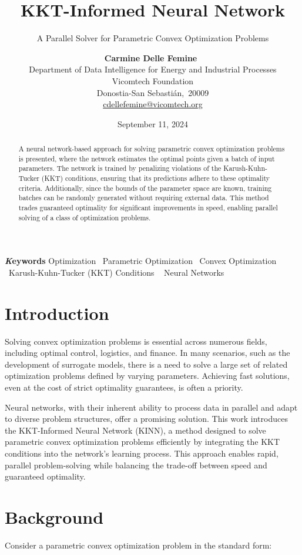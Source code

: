 \documentclass[
]{article}
\title{KKT-Informed Neural Network}
\subtitle{A Parallel Solver for Parametric Convex Optimization Problems}
\author{\textbf{Carmine Delle
Femine}~\orcidlink{0009-0005-7964-8911}\\Department of Data Intelligence
for Energy and Industrial Processes\\Vicomtech Foundation\\Donostia-San
Sebastián,\ 20009\\\href{mailto:cdellefemine@vicomtech.org}{cdellefemine@vicomtech.org}}
\date{September 11, 2024}
\begin{document}
\maketitle
\begin{abstract}
A neural network-based approach for solving parametric convex
optimization problems is presented, where the network estimates the
optimal points given a batch of input parameters. The network is trained
by penalizing violations of the Karush-Kuhn-Tucker (KKT) conditions,
ensuring that its predictions adhere to these optimality criteria.
Additionally, since the bounds of the parameter space are known,
training batches can be randomly generated without requiring external
data. This method trades guaranteed optimality for significant
improvements in speed, enabling parallel solving of a class of
optimization problems.
\end{abstract}
{\bfseries \emph Keywords}
\def\sep{\textbullet\ }
Optimization \sep Parametric Optimization \sep Convex
Optimization \sep Karush-Kuhn-Tucker (KKT) Conditions \sep 
Neural Networks


\section{Introduction}\label{introduction}

Solving convex optimization problems is essential across numerous
fields, including optimal control, logistics, and finance. In many
scenarios, such as the development of surrogate models, there is a need
to solve a large set of related optimization problems defined by varying
parameters. Achieving fast solutions, even at the cost of strict
optimality guarantees, is often a priority.

Neural networks, with their inherent ability to process data in parallel
and adapt to diverse problem structures, offer a promising solution.
This work introduces the KKT-Informed Neural Network (KINN), a method
designed to solve parametric convex optimization problems efficiently by
integrating the KKT conditions into the network's learning process. This
approach enables rapid, parallel problem-solving while balancing the
trade-off between speed and guaranteed optimality.

\section{Background}\label{background}

Consider a parametric convex optimization problem in the standard form:
\end{document}
